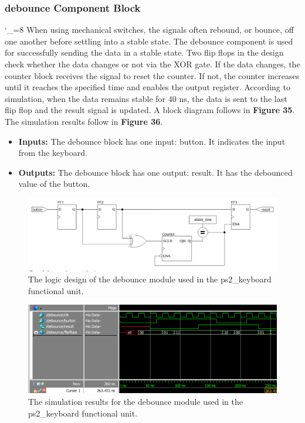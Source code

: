 \documentclass[a4paper]{article}
\begin{document}
\subsubsection{debounce Component Block}
\catcode`_=8
When using mechanical switches, the signals often rebound, or bounce, off one another before settling into a stable state. The debounce component is used for successfully sending the data in a stable state. Two flip flops in the design check whether the data changes or not via the XOR gate. If the data changes, the counter block receives the signal to reset the counter. If not, the counter increases until it reaches the specified time and enables the output register. According to simulation, when the data remains stable for 40 ns, the data is sent to the last flip flop and the result signal is updated.  A block diagram follows in 	\textbf{Figure 35}.  The simulation results follow in \textbf{Figure 36}.
\begin{itemize}
\item \textbf{Inputs:  } The debounce block has one input: button. It indicates the input from the keyboard.
\item \textbf{Outputs: } The debounce block has one output: result. It has the debounced value of the button.
\end{itemize}
\begin{figure}[h]
\centering
\includegraphics[width=.8\textwidth]{functional_units/ps2_keyboard/individual_blocks/debounce_block.png}
\caption{The logic design of the debounce module used in the ps2\_keyboard functional unit.}
\end{figure}
\begin{figure}[h]
\centering
\includegraphics[width=.98\textwidth]{functional_units/ps2_keyboard/individual_blocks/debounce_sim.png}
\caption{The simulation results for the debounce module used in the ps2\_keyboard functional unit.}
\end{figure}
\clearpage
\end{document}
